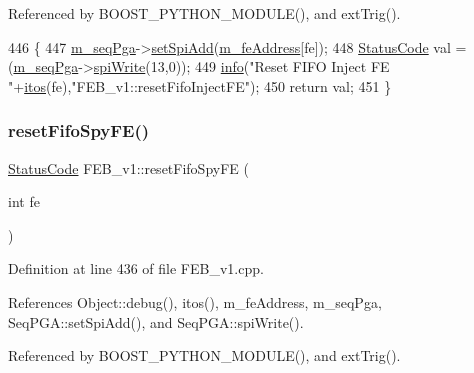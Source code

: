 Referenced by B\+O\+O\+S\+T\+\_\+\+P\+Y\+T\+H\+O\+N\+\_\+\+M\+O\+D\+U\+L\+E(), and ext\+Trig().


\begin{DoxyCode}
446                                           \{  
447   \hyperlink{classFEB__v1_a6c7804ac86796f233a8393043adf2e77}{m\_seqPga}->\hyperlink{classSeqPGA_ac998ce3a6d9b5f2e88cc8393f8c1df53}{setSpiAdd}(\hyperlink{classFEB__v1_a4e1945c2d5b434125f375e9d0fc6d99f}{m\_feAddress}[fe]);
448   \hyperlink{classStatusCode}{StatusCode} val = (\hyperlink{classFEB__v1_a6c7804ac86796f233a8393043adf2e77}{m\_seqPga}->\hyperlink{classSeqPGA_ad4421841ce4ce8b88ad13f63216f0743}{spiWrite}(13,0));
449   \hyperlink{classObject_a644fd329ea4cb85f54fa6846484b84a8}{info}(\textcolor{stringliteral}{"Reset FIFO Inject FE "}+\hyperlink{Tools_8h_af330027dbdafb9a30768b3613c553e60}{itos}(fe),\textcolor{stringliteral}{"FEB\_v1::resetFifoInjectFE"});
450   \textcolor{keywordflow}{return} val;
451 \}
\end{DoxyCode}
\mbox{\label{classFEB__v1_ab02c292e29e01079bb9b268acbc782b1}} 
\subsubsection{\texorpdfstring{reset\+Fifo\+Spy\+F\+E()}{resetFifoSpyFE()}}
{\footnotesize\ttfamily \hyperlink{classStatusCode}{Status\+Code} F\+E\+B\+\_\+v1\+::reset\+Fifo\+Spy\+FE (\begin{DoxyParamCaption}\item[{int}]{fe }\end{DoxyParamCaption})}



Definition at line 436 of file F\+E\+B\+\_\+v1.\+cpp.



References Object\+::debug(), itos(), m\+\_\+fe\+Address, m\+\_\+seq\+Pga, Seq\+P\+G\+A\+::set\+Spi\+Add(), and Seq\+P\+G\+A\+::spi\+Write().



Referenced by B\+O\+O\+S\+T\+\_\+\+P\+Y\+T\+H\+O\+N\+\_\+\+M\+O\+D\+U\+L\+E(), and ext\+Trig().


